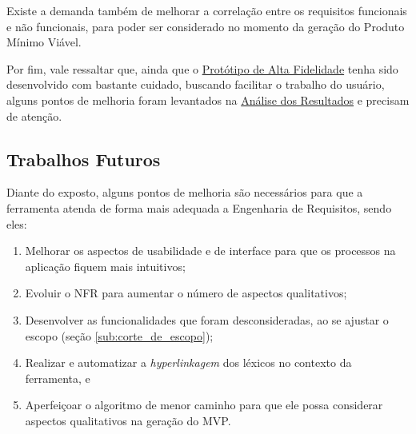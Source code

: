 Existe a demanda também de melhorar a correlação entre os requisitos funcionais e não funcionais, para poder ser considerado no momento da geração do Produto Mínimo Viável.

Por fim, vale ressaltar que, ainda que o \hyperref[sec:prototipo_de_alta_fidelidade]{Protótipo de Alta Fidelidade} tenha sido desenvolvido com bastante cuidado, buscando facilitar o trabalho do usuário, alguns pontos de melhoria foram levantados na \hyperref[chap:analise_resultados]{Análise dos Resultados} e precisam de atenção.

\subsection{Trabalhos Futuros}

Diante do exposto, alguns pontos de melhoria são necessários para que a ferramenta atenda de forma mais adequada a Engenharia de Requisitos, sendo eles:

\begin{enumerate}
    \item Melhorar os aspectos de usabilidade e de interface para que os processos na aplicação fiquem mais intuitivos;
    \item Evoluir o NFR para aumentar o número de aspectos qualitativos;
    \item Desenvolver as funcionalidades que foram desconsideradas, ao se ajustar o escopo (seção \ref{sub:corte_de_escopo});
    \item Realizar e automatizar a \textit{hyperlinkagem} dos léxicos no contexto da ferramenta, e
    \item Aperfeiçoar o algoritmo de menor caminho para que ele possa considerar aspectos qualitativos na geração do MVP.
\end{enumerate}